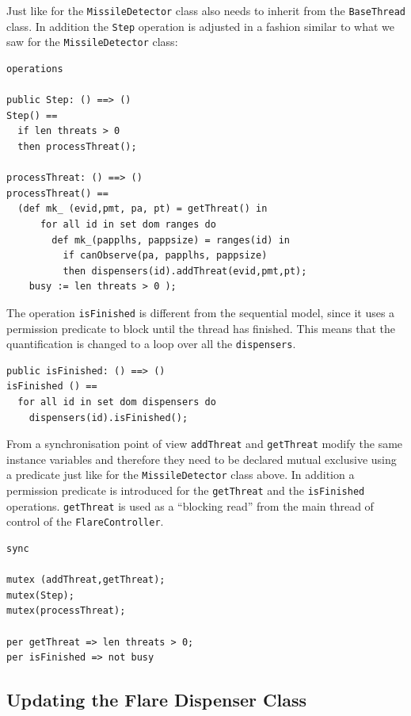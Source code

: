 \documentclass{overturerepchap}
\begin{document}
Just like for the \texttt{MissileDetector} class also needs to inherit
from the \texttt{BaseThread} class. In addition the \texttt{Step}
operation is adjusted in a fashion similar to what we saw for the
\texttt{MissileDetector} class:

\begin{lstlisting}
operations

public Step: () ==> ()
Step() ==
  if len threats > 0
  then processThreat();

processThreat: () ==> ()
processThreat() ==
  (def mk_ (evid,pmt, pa, pt) = getThreat() in
      for all id in set dom ranges do
        def mk_(papplhs, pappsize) = ranges(id) in
          if canObserve(pa, papplhs, pappsize)
          then dispensers(id).addThreat(evid,pmt,pt);
    busy := len threats > 0 );
\end{lstlisting}

The operation \texttt{isFinished} is different from the sequential
model, since it uses a permission predicate to block until the thread
has finished. This means that the {\bf{}} quantification is
changed to a loop over all the \texttt{dispensers}.

\begin{lstlisting}
public isFinished: () ==> ()
isFinished () ==
  for all id in set dom dispensers do
    dispensers(id).isFinished();
\end{lstlisting}

From a synchronisation point of view \texttt{addThreat} and 
\texttt{getThreat} modify the same instance variables and
therefore they need to be declared mutual exclusive using a
{\bf{}} 
predicate just like for the \texttt{MissileDetector} class above. 
In addition a permission predicate is introduced for the
\texttt{getThreat} and the \texttt{isFinished} operations. 
\texttt{getThreat} is used as a ``blocking read'' from the main
thread of control of the \texttt{FlareController}.

\begin{lstlisting}
sync

mutex (addThreat,getThreat);
mutex(Step);
mutex(processThreat);

per getThreat => len threats > 0;
per isFinished => not busy
\end{lstlisting}

\subsection{Updating the Flare Dispenser Class}
\end{document}
